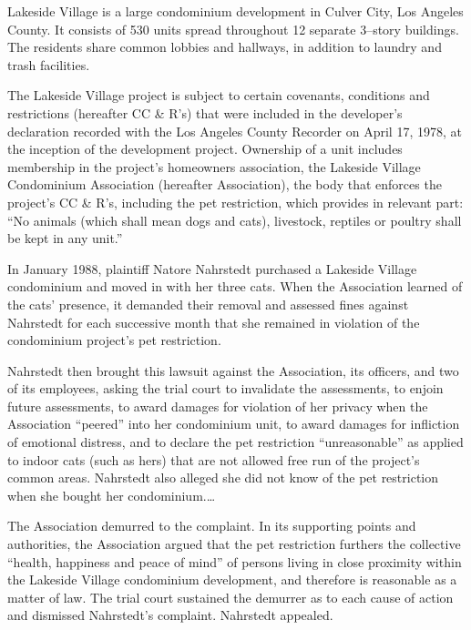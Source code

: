 
Lakeside Village is a large condominium development in Culver City, Los Angeles
County. It consists of 530 units spread throughout 12 separate 3--story
buildings. The residents share common lobbies and hallways, in addition to
laundry and trash facilities.

The Lakeside Village project is subject to certain covenants, conditions and
restrictions (hereafter CC \& R's) that were included in the developer's
declaration recorded with the Los Angeles County Recorder on April 17, 1978, at
the inception of the development project. Ownership of a unit includes
membership in the project's homeowners association, the Lakeside Village
Condominium Association (hereafter Association), the body that enforces the
project's CC \& R's, including the pet restriction, which provides in relevant
part: ``No animals (which shall mean dogs and cats), livestock, reptiles or
poultry shall be kept in any unit.''

In January 1988, plaintiff Natore Nahrstedt purchased a Lakeside Village
condominium and moved in with her three cats. When the Association learned of
the cats' presence, it demanded their removal and assessed fines against
Nahrstedt for each successive month that she remained in violation of the
condominium project's pet restriction.

Nahrstedt then brought this lawsuit against the Association, its officers, and
two of its employees, asking the trial court to invalidate the assessments, to
enjoin future assessments, to award damages for violation of her privacy when
the Association ``peered'' into her condominium unit, to award damages for
infliction of emotional distress, and to declare the pet restriction
``unreasonable'' as applied to indoor cats (such as hers) that are not allowed
free run of the project's common areas. Nahrstedt also alleged she did not know
of the pet restriction when she bought her condominium.\ldots 

The Association demurred to the complaint. In its supporting points and
authorities, the Association argued that the pet restriction furthers the
collective ``health, happiness and peace of mind'' of persons living in close
proximity within the Lakeside Village condominium development, and therefore is
reasonable as a matter of law. The trial court sustained the demurrer as to each
cause of action and dismissed Nahrstedt's complaint. Nahrstedt appealed.

